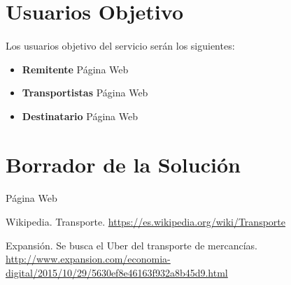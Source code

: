 \documentclass[10pt, a4paper,spanish]{article}
\begin{document}
			
			
		\section{Usuarios Objetivo}
		
			\paragraph{}
			Los usuarios objetivo del servicio serán los siguientes:
			
			\begin{itemize}
				\item{\textbf{Remitente}}
				\newline
				Página Web
				
				\item{\textbf{Transportistas}}
				\newline
				Página Web

				
				\item{\textbf{Destinatario}}
				\newline
				Página Web

			\end{itemize}
		\section{Borrador de la Solución}
		
			\paragraph{}
			Página Web

	\begin{thebibliography}{9}
	
		Wikipedia. Transporte. \url{https://es.wikipedia.org/wiki/Transporte}

		Expansión. Se busca el Uber del transporte de mercancías. \url{http://www.expansion.com/economia-digital/2015/10/29/5630ef8e46163f932a8b45d9.html}
	
	\end{thebibliography}
 
\end{document}
